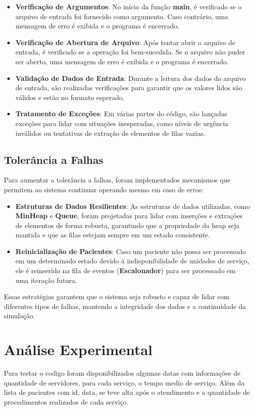 \documentclass[a4paper,12pt]{article}
\begin{document}
\begin{itemize}
    \item \textbf{Verificação de Argumentos}: No início da função \textbf{main}, é verificado se o arquivo de entrada foi fornecido como argumento. Caso contrário, uma mensagem de erro é exibida e o programa é encerrado.
    \item \textbf{Verificação de Abertura de Arquivo}: Após tentar abrir o arquivo de entrada, é verificado se a operação foi bem-sucedida. Se o arquivo não puder ser aberto, uma mensagem de erro é exibida e o programa é encerrado.
    \item \textbf{Validação de Dados de Entrada}: Durante a leitura dos dados do arquivo de entrada, são realizadas verificações para garantir que os valores lidos são válidos e estão no formato esperado.
    \item \textbf{Tratamento de Exceções}: Em várias partes do código, são lançadas exceções para lidar com situações inesperadas, como níveis de urgência inválidos ou tentativas de extração de elementos de filas vazias.
\end{itemize}

\subsection{Tolerância a Falhas}
Para aumentar a tolerância a falhas, foram implementados mecanismos que permitem ao sistema continuar operando mesmo em caso de erros:

\begin{itemize}
    \item \textbf{Estruturas de Dados Resilientes}: As estruturas de dados utilizadas, como \textbf{MinHeap} e \textbf{Queue}, foram projetadas para lidar com inserções e extrações de elementos de forma robusta, garantindo que a propriedade da heap seja mantida e que as filas estejam sempre em um estado consistente.
    \item \textbf{Reinicialização de Pacientes}: Caso um paciente não possa ser processado em um determinado estado devido à indisponibilidade de unidades de serviço, ele é reinserido na fila de eventos (\textbf{Escalonador}) para ser processado em uma iteração futura.
\end{itemize}

Essas estratégias garantem que o sistema seja robusto e capaz de lidar com diferentes tipos de falhas, mantendo a integridade dos dados e a continuidade da simulação.

\section{Análise Experimental}\hspace*{1cm}
Para testar o codigo foram disponibilizados algumas datas com informações de quantidade de servidores, para cada serviço, o tempo medio de serviço.
Além da lista de pacientes com id, data, se teve alta após o atendimento e a quantidade de procedimentos realizados de cada serviço.
\end{document}
